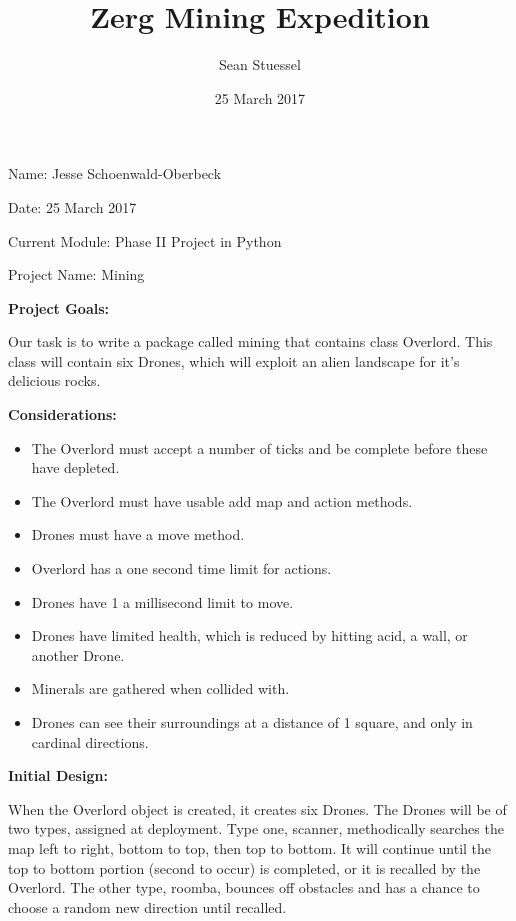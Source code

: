 \documentclass{article}
\title{Zerg Mining Expedition}
\author{Sean Stuessel}
\date{25 March 2017}
\begin{document}
    Name: Jesse Schoenwald-Oberbeck

    Date: 25 March 2017

    Current Module: Phase II Project in Python


    Project Name: Mining
    \bigskip

    \textbf{Project Goals:}

    Our task is to write a package called mining that contains class Overlord. This class will contain six Drones, which will exploit an alien
landscape for it's delicious rocks.
    \bigskip

    \textbf{Considerations:}

    \begin{itemize}\itemsep0pt
    \item The Overlord must accept a number of ticks and be complete before these have depleted.
    \item The Overlord must have usable add map and action methods.
    \item Drones must have a move method.
    \item Overlord has a one second time limit for actions.
    \item Drones have 1 a millisecond limit to move.
    \item Drones have limited health, which is reduced by hitting acid, a wall, or another Drone.
    \item Minerals are gathered when collided with.
    \item Drones can see their surroundings at a distance of 1 square, and only in cardinal directions.
    \end{itemize}

    \textbf{Initial Design:}

    When the Overlord object is created, it creates six Drones. The Drones will be of two types, assigned at deployment. Type one, scanner, methodically searches the map left to right, bottom to top, then top to bottom. It will continue until the top to bottom portion (second to occur) is completed, or it is recalled by the Overlord. The other type, roomba, bounces off obstacles and has a chance to choose a random new direction until recalled.
    \bigskip
\end{document}
